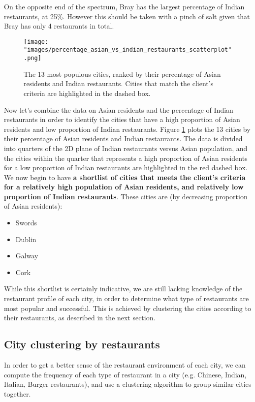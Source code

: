 \documentclass[a4paper,11pt]{article}
\begin{document}
On the opposite end of the spectrum, Bray has the largest percentage of Indian restaurants, at 25\%. However this should be taken with a pinch of salt given that Bray has only 4 restaurants in total.
%
\begin{figure}[htb]
   \centering
   \texttt{[image: "images/percentage\_asian\_vs\_indian\_restaurants\_scatterplot".png]}
      \caption{The 13 most populous cities, ranked by their percentage of Asian residents and Indian restaurants. Cities that match the client's criteria are highlighted in the dashed box.}
      \label{fig:city asian and indian}
\end{figure}
%
Now let's combine the data on Asian residents and the percentage of Indian restaurants in order to identify the cities that have a high proportion of Asian residents and low proportion of Indian restaurants. Figure \ref{fig:city asian and indian} plots the 13 cities by their percentage of Asian residents and Indian restaurants. The data is divided into quarters of the 2D plane of Indian restaurants versus Asian population, and the cities within the quarter that represents a high proportion of Asian residents for a low proportion of Indian restaurants are highlighted in the red dashed box. We now begin to have \textbf{a shortlist of cities that meets the client's criteria for a relatively high population of Asian residents, and relatively low proportion of Indian restaurants}. These cities are (by decreasing proportion of Asian residents):
%
\begin{itemize}
	\item Swords	
	\item Dublin
	\item Galway
	\item Cork
\end{itemize}
%
While this shortlist is certainly indicative, we are still lacking knowledge of the restaurant profile of each city, in order to determine what type of restaurants are most popular and successful. This is achieved by clustering the cities according to their restaurants, as described in the next section.

\subsection{City clustering by restaurants}\label{sec: clustering}
In order to get a better sense of the restaurant environment of each city, we can compute the frequency of each type of restaurant in a city (e.g. Chinese, Indian, Italian, Burger restaurants), and use a clustering algorithm to group similar cities together. 
\end{document}
